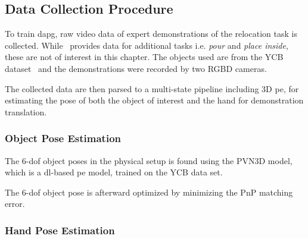 

\subsection{Data Collection Procedure}
To train \gls{dapg}, raw video data of expert demonstrations of the relocation task is collected. While~\cite{dexmv:-imitation-learning-for-dexterous-manipulation-from-human-videos} provides data for additional tasks i.e. \textit{pour} and \textit{place inside}, these are not of interest in this chapter. The objects used are from the YCB dataset~\cite{ycb} and the demonstrations were recorded by two RGBD cameras.\medskip

The collected data are then parsed to a multi-state pipeline including 3D \gls{pe}, for estimating the pose of both the object of interest and the hand for demonstration translation.

\subsubsection{Object Pose Estimation}
The \num{6}-\gls{dof} object poses in the physical setup is found using the PVN3D model, which is a \gls{dl}-based \gls{pe} model, trained on the YCB data set.\medskip

The \num{6}-\gls{dof} object pose is afterward optimized by minimizing the \gls{PnP} matching error.

\subsubsection{Hand Pose Estimation}

